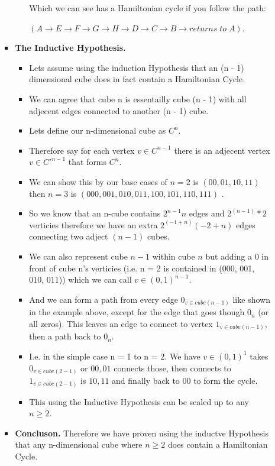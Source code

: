 \documentclass{article}
\begin{document}
\begin{enumerate}
\begin{enumerate}
\begin{itemize}
\begin{itemize}
            Which we can see has a Hamiltonian cycle if you follow the path:
            
            ${(A \rightarrow E \rightarrow F \rightarrow G \rightarrow H \rightarrow D \rightarrow C \rightarrow B \rightarrow returns\;to\;A)}$.
          \end{itemize}
          \item \textbf{The Inductive Hypothesis.}
          \begin{itemize}
            \item Lets assume using the induction Hypothesis that an (n - 1) dimensional cube does in fact contain a Hamiltonian Cycle.
            \item We can agree that cube n is essentailly cube (n - 1) with all adjecent edges connected to another (n - 1) cube.
            \item Lets define our n-dimensional cube as $C^n$.
            \item Therefore say for each vertex $v \in C^{n - 1}$ there is an adjecent vertex $v \in C'^{n - 1}$ that forms $C^n$.
            \item We can show this by our base cases of $n = 2$ is $(00, 01, 10, 11)$ then $n = 3$ is $(000, 001, 010, 011, 100, 101, 110, 111)$ .
            \item So we know that an n-cube contains $2^{n−1}n$ edges and $2^(n - 1) * 2$ verticies therefore we have an extra $2^{(-1 + n)} (-2 + n)$ edges connecting two adject $(n - 1)$ cubes. 
            \item We can also represent cube $n - 1$ within cube $n$ but adding a 0 in front of cube n's verticies (i.e. n = 2 is contained in (000, 001, 010, 011)) which we can call $v \in (0,1)^{n-1}$.
            \item And we can form a path from every edge $0_{v \in cube(n - 1)}$ like shown in the example above, except for the edge that goes though $0_n$ (or all zeros). This leaves an edge to connect to vertex $1_{v \in cube(n - 1)}$, then a path back to $0_n$.
            \item I.e. in the simple case n = 1 to n = 2. We have $v \in (0, 1)^1$ takes $0_{v \in cube(2 - 1)}$ or $00, 01$ connects those, then connects to $1_{v \in cube(2 - 1)}$ is $10, 11$ and finally back to $00$ to form the cycle.
            \item This using the Inductive Hypothesis can be scaled up to any $n \geq 2$. 
        \end{itemize}
        \item \textbf{Concluson.}        
        Therefore we have proven using the inductve Hypothesis that any n-dimensional cube where $n \ge 2$ does contain a Hamiltonian Cycle.
      \end{itemize}
    \end{enumerate}


\end{enumerate}
\end{document}
